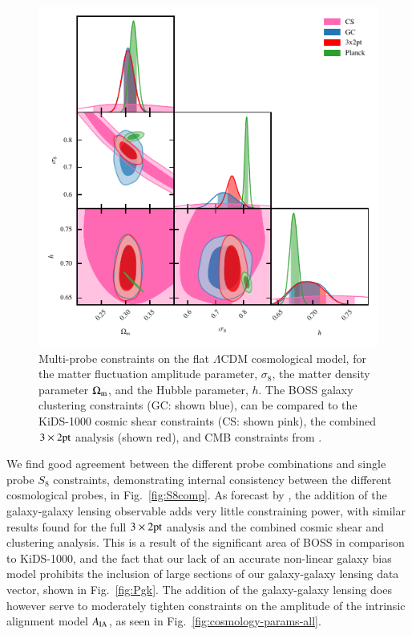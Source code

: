 \begin{figure}
	\begin{center}
		\includegraphics[width=\columnwidth]{Parameter_Plots/cosmology/omegam_sigma8_h_blind_C}
		\caption{Multi-probe constraints on the flat $\Lambda$CDM cosmological model, for the matter fluctuation amplitude parameter, $\sigma_8$, the matter density parameter $\Omega_{\rm m}$, and the Hubble parameter, $h$.  The BOSS galaxy clustering constraints (GC: shown blue), can be compared to the KiDS-1000 cosmic shear constraints (CS: shown pink), the combined $3\times2{\rm pt}$ analysis (shown red), and CMB constraints from \citet{planck/etal:2018}.}
		\label{fig:cosmology-params}
	\end{center}
\end{figure}

We find good agreement between the different probe combinations and single probe $S_8$ constraints, demonstrating internal consistency between the different cosmological probes, in Fig.~\ref{fig:S8comp}.  As forecast by \citet{joachimi/etal:inprep}, the addition of the galaxy-galaxy lensing observable adds very little constraining power, with similar results found for the full $3\times2{\rm pt}$ analysis and the combined cosmic shear and clustering analysis.   This is a result of the significant area of BOSS in comparison to KiDS-1000, and the fact that our lack of an accurate non-linear galaxy bias model prohibits the inclusion of large sections of our galaxy-galaxy lensing data vector, shown in Fig.~\ref{fig:Pgk}.     The addition of the galaxy-galaxy lensing does however serve to moderately tighten constraints on the amplitude of the intrinsic alignment model $A_{\rm IA}$,  as seen in Fig.~\ref{fig:cosmology-params-all}. 

